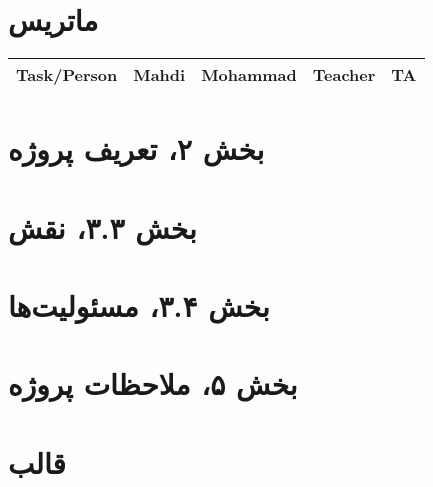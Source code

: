 \documentclass[11pt, oneside]{book}
\begin{document}
\frontmatter

\tableofcontents
\mainmatter

\chapter{ماتریس }
\begin{table}[H]
\begin{latin}
\begin{center}
\begin{tabular}{|c|c|c|c|c|}
\hline
Task/Person & Mahdi & Mohammad & Teacher & TA \\
\hline
\end{tabular}
\end{center}
\end{latin}
\end{table}

\chapter{بخش ۲، تعریف پروژه\\}

\chapter{بخش ۳.۳، نقش\\}

\chapter{بخش ۳.۴، مسئولیت‌ها\\}

\chapter{بخش ۵، ملاحظات پروژه\\}

\chapter{قالب }
\end{document}
